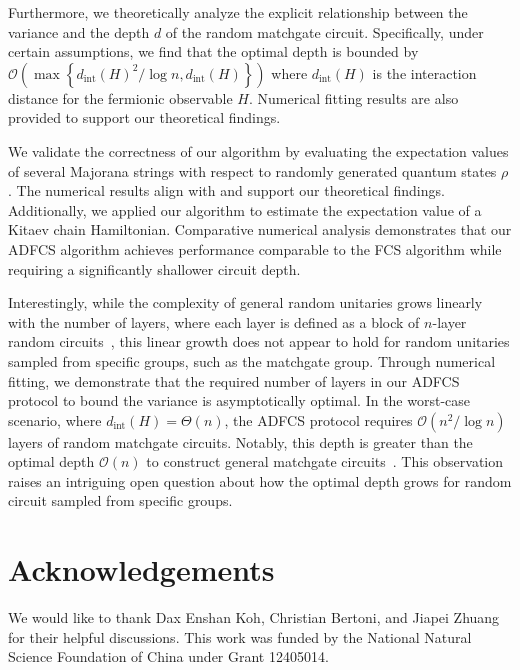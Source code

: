 \documentclass[showpacs,twocolumn,aps,prx,long bibliography,superscriptaddress,notitlepage]{revtex4-1}
\newcommand{\Ord}[1]{\mathcal{O}\left( #1 \right)}
\begin{document}
Furthermore, we theoretically analyze the explicit relationship between the variance and the depth $d$ of the random matchgate circuit. Specifically, under certain assumptions, we find that the optimal depth is {bounded by} $\Ord{\max\left\{{d_{\text{int}}(H)^2}/{\log n}, d_{\text{int}}(H)\right\}}$ where $d_{\text{int}}(H)$ is the interaction distance for the fermionic observable $H$. Numerical fitting results are also provided to support our theoretical findings.

We validate the correctness of our algorithm by evaluating the expectation values of several Majorana strings with respect to randomly generated quantum states $\rho$. The numerical results align with and support our theoretical findings. Additionally, we applied our algorithm to estimate the expectation value of a Kitaev chain Hamiltonian. Comparative numerical analysis demonstrates that our ADFCS algorithm achieves performance comparable to the FCS algorithm while requiring a significantly shallower circuit depth.

{Interestingly, while the complexity of general random unitaries grows linearly with the number of layers, where each layer is defined as a block of $n$-layer random circuits~\cite{haferkamp2022linear}, this linear growth does not appear to hold for random unitaries sampled from specific groups, such as the matchgate group.
Through numerical fitting, we demonstrate that the required number of layers in our ADFCS protocol to bound the variance is asymptotically optimal. In the worst-case scenario, where $d_{\text{int}}(H) = \Theta(n)$, the ADFCS protocol requires $\Ord{n^2 / \log n}$ layers of random matchgate circuits. Notably, this depth is greater than the optimal depth $\Ord{n}$ to construct general matchgate circuits~\cite{jiang2018quantum}.
 This observation raises an intriguing open question about how the optimal depth grows for random circuit sampled from specific groups.}


\section*{Acknowledgements}
 We would like to thank Dax Enshan Koh, Christian Bertoni, {and Jiapei Zhuang} for their helpful discussions.
This work was funded by the National Natural Science Foundation of China under Grant 12405014.



% 
\end{document}
